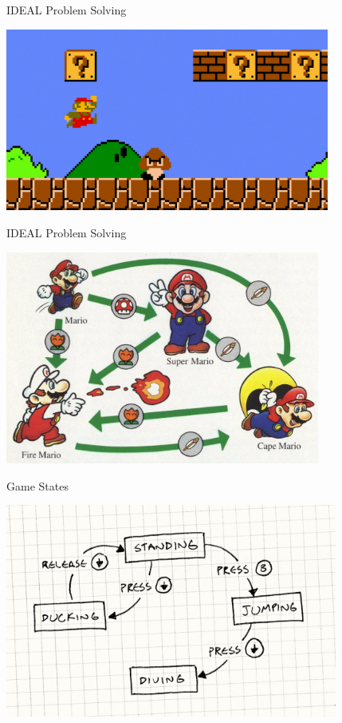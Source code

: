 \documentclass[10pt]{beamer}
\begin{document}

\begin{frame}{IDEAL Problem Solving}
\begin{center}
    	 \includegraphics[height=6cm]{images/superm}
\end{center}
\end{frame}

\begin{frame}{IDEAL Problem Solving}
\begin{center}
    	 \includegraphics[height=7cm]{images/mariobig}
\end{center}
\end{frame}


\begin{frame}{Game States}
\begin{center}
    	 \includegraphics[height=7cm]{images/gameflowchart}
\end{center}
\end{frame}
\end{document}

